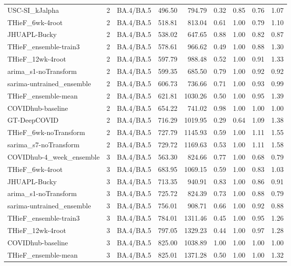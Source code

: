 \documentclass[12pt]{article}
\begin{document}
\begin{longtable}{lrlrrrrrr}
  USC-SI\_kJalpha & 2 & BA.4/BA.5 & 496.50 & 794.79 & 0.32 & 0.85 & 0.76 & 1.07 \\ 
  THieF\_6wk-4root & 2 & BA.4/BA.5 & 518.81 & 813.04 & 0.61 & 1.00 & 0.79 & 1.10 \\ 
  JHUAPL-Bucky & 2 & BA.4/BA.5 & 538.02 & 647.65 & 0.88 & 1.00 & 0.82 & 0.87 \\ 
  THieF\_ensemble-train3 & 2 & BA.4/BA.5 & 578.61 & 966.62 & 0.49 & 1.00 & 0.88 & 1.30 \\ 
  THieF\_12wk-4root & 2 & BA.4/BA.5 & 597.79 & 988.48 & 0.52 & 1.00 & 0.91 & 1.33 \\ 
  arima\_s1-noTransform & 2 & BA.4/BA.5 & 599.35 & 685.50 & 0.79 & 1.00 & 0.92 & 0.92 \\ 
  sarima-untrained\_ensemble & 2 & BA.4/BA.5 & 606.73 & 736.66 & 0.71 & 1.00 & 0.93 & 0.99 \\ 
  THieF\_ensemble-mean & 2 & BA.4/BA.5 & 621.81 & 1030.26 & 0.50 & 1.00 & 0.95 & 1.39 \\ 
  COVIDhub-baseline & 2 & BA.4/BA.5 & 654.22 & 741.02 & 0.98 & 1.00 & 1.00 & 1.00 \\ 
  GT-DeepCOVID & 2 & BA.4/BA.5 & 716.29 & 1019.95 & 0.29 & 0.64 & 1.09 & 1.38 \\ 
  THieF\_6wk-noTransform & 2 & BA.4/BA.5 & 727.79 & 1145.93 & 0.59 & 1.00 & 1.11 & 1.55 \\ 
  sarima\_s7-noTransform & 2 & BA.4/BA.5 & 729.72 & 1169.63 & 0.53 & 1.00 & 1.11 & 1.58 \\ 
  COVIDhub-4\_week\_ensemble & 3 & BA.4/BA.5 & 563.30 & 824.66 & 0.77 & 1.00 & 0.68 & 0.79 \\ 
  THieF\_6wk-4root & 3 & BA.4/BA.5 & 683.95 & 1069.15 & 0.59 & 1.00 & 0.83 & 1.03 \\ 
  JHUAPL-Bucky & 3 & BA.4/BA.5 & 713.35 & 940.91 & 0.83 & 1.00 & 0.86 & 0.91 \\ 
  arima\_s1-noTransform & 3 & BA.4/BA.5 & 725.72 & 824.39 & 0.73 & 1.00 & 0.88 & 0.79 \\ 
  sarima-untrained\_ensemble & 3 & BA.4/BA.5 & 756.01 & 908.71 & 0.66 & 1.00 & 0.92 & 0.88 \\ 
  THieF\_ensemble-train3 & 3 & BA.4/BA.5 & 784.01 & 1311.46 & 0.45 & 1.00 & 0.95 & 1.26 \\ 
  THieF\_12wk-4root & 3 & BA.4/BA.5 & 797.05 & 1329.23 & 0.44 & 1.00 & 0.97 & 1.28 \\ 
  COVIDhub-baseline & 3 & BA.4/BA.5 & 825.00 & 1038.89 & 1.00 & 1.00 & 1.00 & 1.00 \\ 
  THieF\_ensemble-mean & 3 & BA.4/BA.5 & 825.01 & 1371.28 & 0.50 & 1.00 & 1.00 & 1.32 \\ 

\end{longtable}
\end{document}
